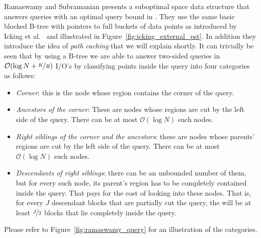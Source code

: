 \documentclass[twoside,11pt,openright]{report}
\begin{document}
Ramaswamy and Subramanian presents a suboptimal space data structure that answers queries with an optimal query bound in \cite{Ramaswamy:1994:PCT:182591.182595}. They use the same basic blocked B-tree with pointers to full buckets of data points as introduced by Icking et al.~\cite{Icking1988} and illustrated in Figure~\ref{fig:icking_external_pst}. In addition they introduce the idea of \textit{path caching} that we will explain shortly. It can trivially be seen that by using a B-tree we are able to answer two-sided queries in $\mathcal{O}(\log N + \nicefrac{K}{B})$ I/O's by classifying points inside the query into four categories as follows:

\begin{itemize}
	\item \textit{Corner}: this is the node whose region contains the corner of the query.
	\item \textit{Ancestors of the corner}: These are nodes whose regions are cut by the left side of the query. There can be at most $\mathcal{O}(\log N)$ such nodes.
	\item \textit{Right siblings of the corner and the ancestors}: these are nodes whose parents' regions are cut by the left side of the query. There can be at most $ \mathcal{O}(\log N)$ such nodes.
	\item \textit{Descendants of right siblings}: there can be an unbounded number of them, but for every such node, its parent's region has to be completely contained inside the query. That pays for the cost of looking into these nodes. That is, for every $J$ descendant blocks that are partially cut the query, the will be at least $\nicefrac{J}{2}$ blocks that lie completely inside the query. 

\end{itemize} 
 
Please refer to Figure~\ref{fig:ramaswamy_query} for an illustration of the categories.
\end{document}
